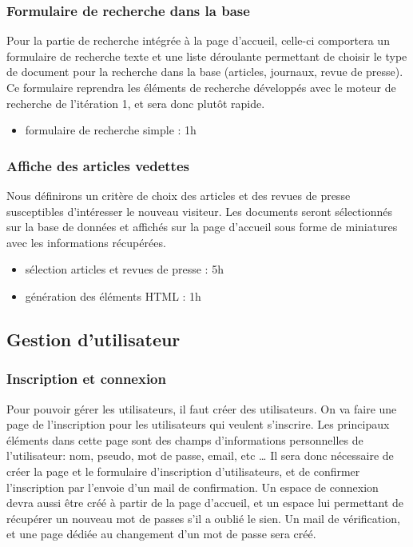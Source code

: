 		\subsubsection{Formulaire de recherche dans la base}
		\label{subsubsec:acc_rech}
			Pour la partie de recherche intégrée à la page d’accueil, celle-ci comportera un formulaire de recherche texte et une liste déroulante permettant de choisir le type de document pour la recherche dans la base (articles, journaux, revue de presse). Ce formulaire reprendra les éléments de recherche développés avec le moteur de recherche de l'itération 1, et sera donc plutôt rapide.

			\begin{itemize}
				\item formulaire de recherche simple : 1h
			\end{itemize}

		\subsubsection{Affiche des articles vedettes} 
		\label{subsubsec:acc_article}
			Nous définirons un critère de choix des articles et des revues de presse susceptibles d'intéresser le nouveau visiteur. Les documents seront sélectionnés sur la base de données et affichés sur la page d'accueil sous forme de miniatures avec les informations récupérées.

			\begin{itemize}
				\item sélection articles et revues de presse : 5h
				\item génération des éléments HTML : 1h
			\end{itemize}

	\subsection{Gestion d'utilisateur}
	\label{subsec:utilisateur}
		\subsubsection{Inscription et connexion}
		\label{subsubsec:util_inscr}
			Pour pouvoir gérer les utilisateurs, il faut créer des utilisateurs. On va faire une page de l’inscription pour les utilisateurs qui veulent s’inscrire. Les principaux éléments dans cette page sont des champs d’informations personnelles de l’utilisateur: nom, pseudo, mot de passe, email, etc … Il sera donc nécessaire de créer la page et le formulaire d'inscription d'utilisateurs, et de confirmer l'inscription par l'envoie d'un mail de confirmation. Un espace de connexion devra aussi être créé à partir de la page d'accueil, et un espace lui permettant de récupérer un nouveau mot de passes s'il a oublié le sien. Un mail de vérification, et une page dédiée au changement d'un mot de passe sera créé.

